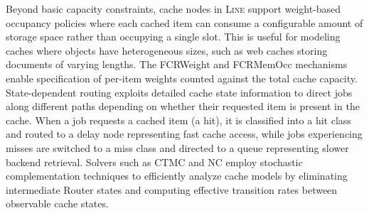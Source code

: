 Beyond basic capacity constraints, cache nodes in \textsc{Line} support weight-based occupancy policies where each cached item can consume a configurable amount of storage space rather than occupying a single slot. This is useful for modeling caches where objects have heterogeneous sizes, such as web caches storing documents of varying lengths. The FCRWeight and FCRMemOcc mechanisms enable specification of per-item weights counted against the total cache capacity. State-dependent routing exploits detailed cache state information to direct jobs along different paths depending on whether their requested item is present in the cache. When a job requests a cached item (a hit), it is classified into a hit class and routed to a delay node representing fast cache access, while jobs experiencing misses are switched to a miss class and directed to a queue representing slower backend retrieval. Solvers such as CTMC and NC employ stochastic complementation techniques to efficiently analyze cache models by eliminating intermediate Router states and computing effective transition rates between observable cache states.

